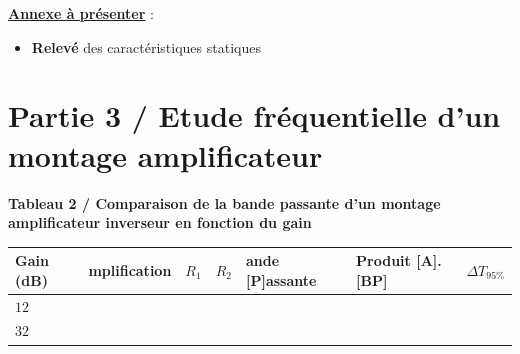 \medskip

\noindent
\underline{\textbf{Annexe à présenter}} : 
\begin{itemize}[label=$\square$]
	\item \textbf{Relevé} des caractéristiques statiques 
\end{itemize}
 
\medskip

\noindent
\begin{minipage}{0.23\linewidth}
\end{minipage}
\hfill
\begin{minipage}{0.23\linewidth}
\end{minipage}
\hfill
\begin{minipage}{0.23\linewidth}
\end{minipage}
\hfill
\begin{minipage}{0.23\linewidth}
\end{minipage}



\clearpage
\section{Partie 3 / Etude fréquentielle d'un montage amplificateur}

\textbf{Tableau 2 / Comparaison de la bande passante d'un montage amplificateur inverseur en fonction du gain}


\medskip

\begin{center}
\begin{tabular}{|>{\centering\arraybackslash}p{2cm}|>{\centering\arraybackslash}p{3cm}|>{\centering\arraybackslash}p{1.5cm}|>{\centering\arraybackslash}p{1.5cm}|>{\centering\arraybackslash}p{2.2cm}|>{\centering\arraybackslash}p{2.2cm}|>{\centering\arraybackslash}p{2cm}|}
  \hline
  Gain (dB) & [A]mplification & $R_1$ & $R_2$ & [B]ande [P]assante & Produit [A].[BP] & $\Delta{}T_{95\%}$\\
  \hline
  $12$ &  &  &  & & & \rule{0pt}{1.8em} \\
  \hline
  $32$ &  &  &  & & & \rule{0pt}{1.8em} \\
  \hline
\end{tabular}
\end{center}

